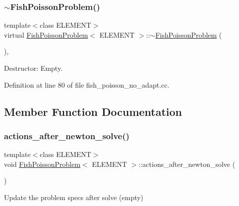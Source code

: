 \subsubsection{\texorpdfstring{$\sim$\+Fish\+Poisson\+Problem()}{~FishPoissonProblem()}}
{\footnotesize\ttfamily template$<$class E\+L\+E\+M\+E\+NT$>$ \\
virtual \hyperlink{classFishPoissonProblem}{Fish\+Poisson\+Problem}$<$ E\+L\+E\+M\+E\+NT $>$\+::$\sim$\hyperlink{classFishPoissonProblem}{Fish\+Poisson\+Problem} (\begin{DoxyParamCaption}{ }\end{DoxyParamCaption})\hspace{0.3cm}{\ttfamily [inline]}, {\ttfamily [virtual]}}



Destructor\+: Empty. 



Definition at line 80 of file fish\+\_\+poisson\+\_\+no\+\_\+adapt.\+cc.



\subsection{Member Function Documentation}
\mbox{\label{classFishPoissonProblem_a76f4ada436ceaa1d0ba96289503d99aa}} 
\subsubsection{\texorpdfstring{actions\+\_\+after\+\_\+newton\+\_\+solve()}{actions\_after\_newton\_solve()}}
{\footnotesize\ttfamily template$<$class E\+L\+E\+M\+E\+NT$>$ \\
void \hyperlink{classFishPoissonProblem}{Fish\+Poisson\+Problem}$<$ E\+L\+E\+M\+E\+NT $>$\+::actions\+\_\+after\+\_\+newton\+\_\+solve (\begin{DoxyParamCaption}{ }\end{DoxyParamCaption})\hspace{0.3cm}{\ttfamily [inline]}}



Update the problem specs after solve (empty) 



